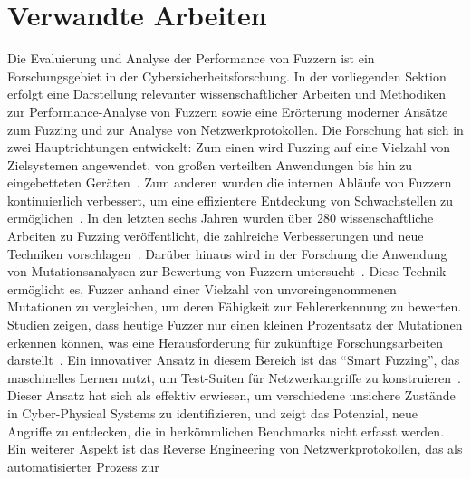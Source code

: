 
\section{Verwandte Arbeiten}\label{sec:related-work}
Die Evaluierung und Analyse der Performance von Fuzzern ist ein Forschungsgebiet in der Cybersicherheitsforschung.
In der vorliegenden Sektion erfolgt eine Darstellung relevanter wissenschaftlicher Arbeiten und Methodiken zur Performance-Analyse
von Fuzzern sowie eine Erörterung moderner Ansätze zum Fuzzing und zur Analyse von Netzwerkprotokollen.\newline\newline
Die Forschung hat sich in zwei Hauptrichtungen entwickelt: Zum einen wird Fuzzing auf eine Vielzahl von Zielsystemen angewendet,
von großen verteilten Anwendungen bis hin zu eingebetteten Geräten~\cite{iot-fuzzing,fuzzing-assessment,embedded-fuzzing,iot-fuzzer}.
Zum anderen wurden die internen Abläufe von Fuzzern kontinuierlich verbessert, um eine effizientere Entdeckung von Schwachstellen
zu ermöglichen~\cite{fuzzing-evaluation,a-survey-of-network-protocol-fuzzing,AFLplusplus-Woot20, mutuation-analysis}.
In den letzten sechs Jahren wurden über 280 wissenschaftliche Arbeiten zu Fuzzing veröffentlicht, die zahlreiche Verbesserungen
und neue Techniken vorschlagen~\cite{fuzzing-evaluation}.\newline
Darüber hinaus wird in der Forschung die Anwendung von Mutationsanalysen zur Bewertung von Fuzzern untersucht~\cite{mutuation-analysis}.
Diese Technik ermöglicht es, Fuzzer anhand einer Vielzahl von unvoreingenommenen Mutationen zu vergleichen, um deren Fähigkeit
zur Fehlererkennung zu bewerten.
Studien zeigen, dass heutige Fuzzer nur einen kleinen Prozentsatz der Mutationen erkennen können, was eine Herausforderung
für zukünftige Forschungsarbeiten darstellt~\cite{mutuation-analysis}.\newline
Ein innovativer Ansatz in diesem Bereich ist das \enquote{Smart Fuzzing}, das maschinelles Lernen nutzt, um Test-Suiten für
Netzwerkangriffe zu konstruieren~\cite{smart-fuzzing,pulsar,cnn}.
Dieser Ansatz hat sich als effektiv erwiesen, um verschiedene unsichere Zustände in Cyber-Physical Systems zu identifizieren,
und zeigt das Potenzial, neue Angriffe zu entdecken, die in herkömmlichen Benchmarks nicht erfasst werden.\newline
Ein weiterer Aspekt ist das Reverse Engineering von Netzwerkprotokollen, das als automatisierter Prozess zur
